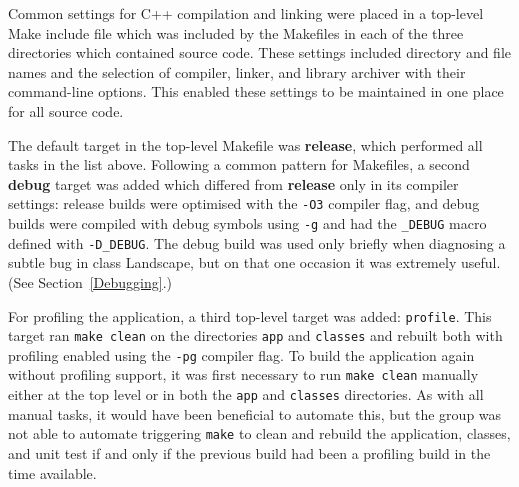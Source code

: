Common settings for C++ compilation and linking were placed in a top-level Make include file which was included by the Makefiles in each of the three directories which contained source code.  These settings included directory and file names and the selection of compiler, linker, and library archiver with their command-line options.  This enabled these settings to be maintained in one place for all source code.  

The default target in the top-level Makefile was \textbf{release}, which performed all tasks in the list above.  Following a common pattern for Makefiles, a second \textbf{debug} target was added which differed from \textbf{release} only in its compiler settings: release builds were optimised with the \texttt{-O3} compiler flag, and debug builds were compiled with debug symbols using \texttt{-g} and had the \texttt{\_DEBUG} macro defined with \texttt{-D\_DEBUG}.  The debug build was used only briefly when diagnosing a subtle bug in class Landscape, but on that one occasion it was extremely useful.  (See Section~\ref{Debugging}.)

For profiling the application, a third top-level target was added: \texttt{profile}.  This target ran \texttt{make clean} on the directories \texttt{app} and \texttt{classes} and rebuilt both with profiling enabled using the \texttt{-pg} compiler flag.  To build the application again without profiling support, it was first necessary to run \texttt{make clean} manually either at the top level or in both the \texttt{app} and \texttt{classes} directories.  As with all manual tasks, it would have been beneficial to automate this, but the group was not able to automate triggering \texttt{make} to clean and rebuild the application, classes, and unit test if and only if the previous build had been a profiling build in the time available.
